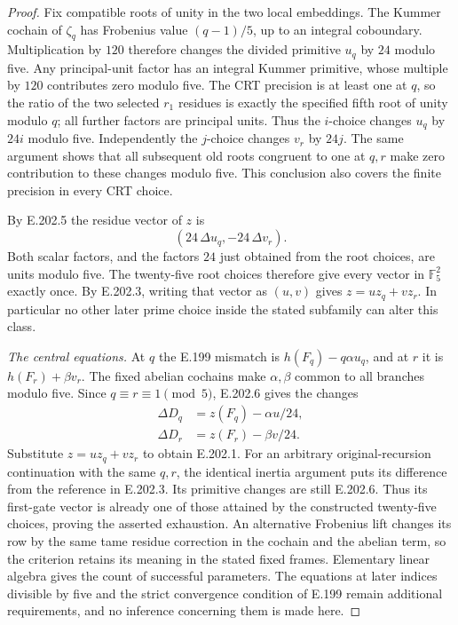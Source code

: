 \begin{proof}
Fix compatible roots of unity in the two local embeddings.
The Kummer cochain of $\zeta_q$ has Frobenius value
$(q-1)/5$, up to an integral coboundary.  Multiplication by
$120$ therefore changes the divided primitive $u_q$ by
$24$ modulo five.  Any principal-unit factor has an integral
Kummer primitive, whose multiple by $120$ contributes zero
modulo five.  The CRT precision is at least one at $q$,
so the ratio of the two selected $r_1$ residues is exactly the
specified fifth root of unity modulo $q$; all further factors
are principal units.  Thus the $i$-choice changes $u_q$ by
$24i$ modulo five.  Independently the $j$-choice changes
$v_r$ by $24j$.  The same argument shows that all subsequent
old roots congruent to one at $q,r$ make zero contribution to
these changes modulo five.  This conclusion also covers the
finite precision in every CRT choice.

By E.202.5 the residue vector of $z$ is
\[
                 (24\,\Delta u_q,-24\,\Delta v_r).
 \tag{E.202.6}
\]
Both scalar factors, and the factors $24$ just obtained from
the root choices, are units modulo five.  The twenty-five root
choices therefore give every vector in $\mathbb F_5^2$ exactly
once.  By E.202.3, writing that vector as $(u,v)$ gives
$z=u z_q+v z_r$.  In particular no other later prime choice
inside the stated subfamily can alter this class.

\emph{The central equations.}
At $q$ the E.199 mismatch is $h(F_q)-q\alpha u_q$, and at
$r$ it is $h(F_r)+\beta v_r$.  The fixed abelian cochains
make $\alpha,\beta$ common to all branches modulo five.
Since $q\equiv r\equiv1\pmod5$, E.202.6 gives the changes
\[
\begin{aligned}
 \Delta D_q&=z(F_q)-\alpha u/24,\\
 \Delta D_r&=z(F_r)-\beta v/24.
\end{aligned}
\]
Substitute $z=u z_q+v z_r$ to obtain E.202.1.
For an arbitrary original-recursion continuation with the same
$q,r$, the identical inertia argument puts its difference from the
reference in E.202.3.  Its primitive changes are still E.202.6.
Thus its first-gate vector is already one of those attained by the
constructed twenty-five choices, proving the asserted exhaustion.
An alternative Frobenius lift changes its row by the same tame
residue correction in the cochain and the abelian term, so the
criterion retains its meaning in the stated fixed frames.
Elementary linear algebra gives the count of successful
parameters.  The equations at later indices divisible by five
and the strict convergence condition of E.199 remain additional
requirements, and no inference concerning them is made here.
\end{proof}

